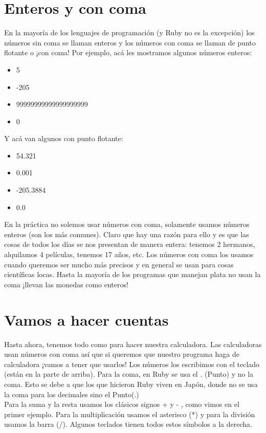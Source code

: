 \section{Enteros y con coma}
En la mayoría de los lenguajes de programación (y Ruby no es la excepción) los números sin coma se llaman enteros y los números con coma se llaman de punto flotante o ¡con coma! Por ejemplo, acá les mostramos algunos números enteros: 

\begin{itemize}
  \item 5
  \item -205
  \item 99999999999999999999
  \item 0
\end{itemize}

Y acá van algunos con punto flotante: 

\begin{itemize}
  \item 54.321
  \item 0.001
  \item -205.3884
  \item 0.0
\end{itemize}

En la práctica no solemos usar  números con coma, solamente usamos números enteros (son los más comunes). Claro que hay una razón para ello y es que las cosas de todos los días se nos presentan de manera entera: tenemos 2 hermanos, alquilamos 4 películas, tenemos 17 años, etc. Los números con coma los usamos cuando queremos ser mucho más precisos y en general se usan para cosas científicas locas. Hasta la mayoría de los programas que manejan plata no usan la coma ¡llevan las monedas como enteros!

\section{Vamos a hacer cuentas}
Hasta ahora, tenemos todo como para hacer nuestra calculadora. Las calculadoras usan números con coma así que si queremos que nuestro programa haga de calculadora ¡vamos a tener que usarlos! Los números los escribimos con el teclado (están en la parte de arriba). Para la coma, en Ruby se usa el . (Punto) y no la coma.  Esto se debe a que los que hicieron Ruby viven en Japón, donde no se usa la coma para los decimales sino el Punto(.)\\

Para la suma y la resta usamos los clásicos signos + y - , como vimos en el primer ejemplo. Para la multiplicación usamos el asterisco (*) y para la división usamos la barra (/). Algunos teclados tienen todos estos símbolos a la derecha.\\

